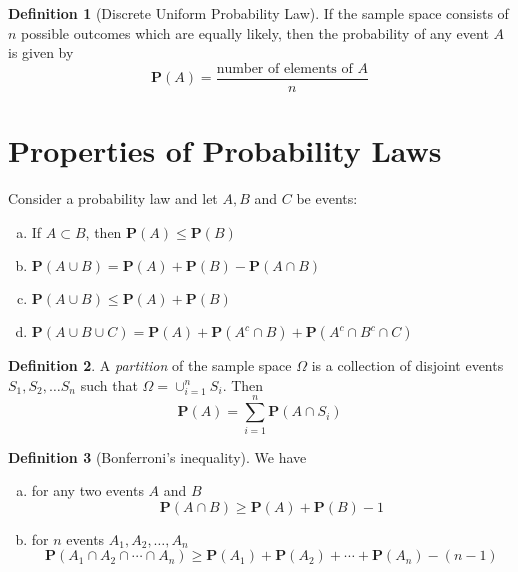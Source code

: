 \documentclass{tufte-handout}
\theoremstyle{definition} \newtheorem{definition}{Definition}
\theoremstyle{remark} \newtheorem{remark}{Remark}
\newcommand{\prob}[1]{\mathbf{P}\left(#1\right)}
\begin{document}
\begin{definition}[Discrete Uniform Probability Law]
  If the sample space consists of $n$ possible outcomes which are equally
  likely, then the probability of any event $A$ is given by
  \begin{equation*}
    \prob{A} = \frac{\text{number of elements of }A}{n}
  \end{equation*}
\end{definition}

\section{Properties of Probability Laws}
Consider a probability law and let $A, B$ and $C$ be events:
\begin{enumerate}[(a)]
\item If $A \subset B$, then $\prob{A} \leq \prob{B}$
\item $\prob{A \cup B} = \prob{A} + \prob{B} - \prob{A \cap B}$
\item $\prob{A \cup B} \leq \prob{A} + \prob{B}$
\item $\prob{A \cup B \cup C} = \prob{A} + \prob{A^c \cap B} +
  \prob{A^c \cap B^c \cap C}$
\end{enumerate}

\begin{definition}
  A \emph{partition} of the sample space $\Omega$ is a collection of
  disjoint events $S_1, S_2, \ldots S_n$ such that $\Omega =
  \cup_{i=1}^n S_i$. Then
  \begin{equation*}
    \prob{A} = \sum_{i=1}^n \prob{A \cap S_i}
  \end{equation*}
\end{definition}

\begin{definition}[Bonferroni's inequality]
  We have
  \begin{enumerate}[(a)]
  \item for any two events $A$ and $B$
    \begin{equation*}
      \prob{A \cap B} \geq \prob{A} + \prob{B} - 1
    \end{equation*}
  \item for $n$ events $A_1, A_2, \ldots, A_n$
    \begin{equation*}
      \prob{A_1 \cap A_2 \cap \cdots \cap A_n} \geq \prob{A_1} +
      \prob{A_2} + \cdots + \prob{A_n} - (n - 1)
    \end{equation*}
  \end{enumerate}
\end{definition}
\end{document}

